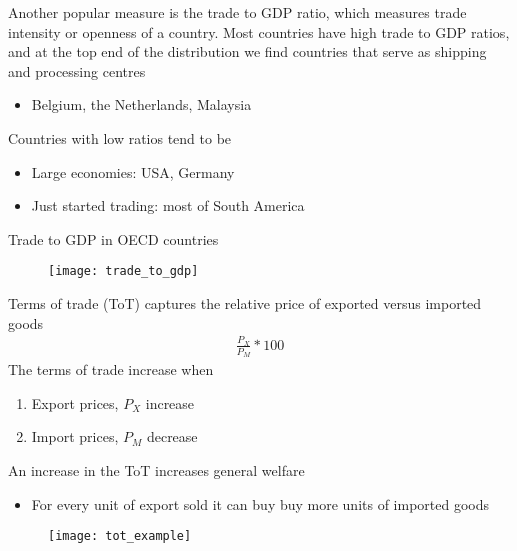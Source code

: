 \documentclass{beamer}
\begin{document}
\begin{frame}{}
  Another popular measure is the trade to GDP ratio, which measures trade intensity or openness of a country.
  Most countries have high trade to GDP ratios, and at the top end of the distribution we find countries that serve as shipping and processing centres
    \begin{itemize}
      \item Belgium, the Netherlands, Malaysia
    \end{itemize}
    \medskip
    Countries with low ratios tend to be    
    \begin{itemize}
      \item Large economies: USA, Germany
      \item Just started trading: most of South America
    \end{itemize}
\end{frame}

\begin{frame}{Trade to GDP in OECD countries}
  \begin{figure}
    \texttt{[image: trade\_to\_gdp]}
  \end{figure}  
\end{frame}


\begin{frame}
  Terms of trade (ToT) captures the relative price of exported versus imported goods
  \begin{align*}
    \frac{P_X}{P_M}*100
  \end{align*}
  The terms of trade increase when 
  \begin{enumerate}
    \item Export prices, $P_X$ increase
    \item Import prices, $P_M$ decrease
  \end{enumerate}
  \medskip
  An increase in the ToT increases general welfare  
    \begin{itemize}
      \item For every unit of export sold it can buy buy more units of imported goods
    \end{itemize}
\end{frame}

\begin{frame}{}
  \begin{figure}
    \texttt{[image: tot\_example]}
  \end{figure}  
\end{frame}
\end{document}
